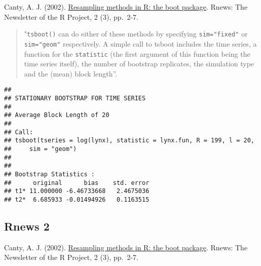 \documentclass[
]{book}
\newenvironment{Shaded}{\begin{snugshade}}{\end{snugshade}}
\newcommand{\CommentTok}[1]{\textcolor[rgb]{0.56,0.35,0.01}{\textit{#1}}}
\newcommand{\ControlFlowTok}[1]{\textcolor[rgb]{0.13,0.29,0.53}{\textbf{#1}}}
\newcommand{\DataTypeTok}[1]{\textcolor[rgb]{0.13,0.29,0.53}{#1}}
\newcommand{\DecValTok}[1]{\textcolor[rgb]{0.00,0.00,0.81}{#1}}
\newcommand{\KeywordTok}[1]{\textcolor[rgb]{0.13,0.29,0.53}{\textbf{#1}}}
\newcommand{\NormalTok}[1]{#1}
\newcommand{\OperatorTok}[1]{\textcolor[rgb]{0.81,0.36,0.00}{\textbf{#1}}}
\newcommand{\StringTok}[1]{\textcolor[rgb]{0.31,0.60,0.02}{#1}}
\theoremstyle{break}
\theoremstyle{definition}
\theoremstyle{definition}
\theoremstyle{definition}
\theoremstyle{remark}
\begin{document}
Canty, A. J. (2002). \href{http://cran.fhcrc.org/doc/Rnews/Rnews_2002-3.pdf}{Resampling methods in R: the boot package}. Rnews: The Newsletter of the R Project, 2 (3), pp.~2-7.

\begin{quote}
"\texttt{tsboot()} can do either of these methods
by specifying \texttt{sim="fixed"} or \texttt{sim="geom"} respectively.
A simple call to tsboot includes the time
series, a function for the \texttt{statistic} (the first argument
of this function being the time series itself), the number
of bootstrap replicates, the simulation type and
the (mean) block length''.
\end{quote}

\begin{Shaded}
\end{Shaded}

\begin{verbatim}
## 
## STATIONARY BOOTSTRAP FOR TIME SERIES
## 
## Average Block Length of 20 
## 
## Call:
## tsboot(tseries = log(lynx), statistic = lynx.fun, R = 199, l = 20, 
##     sim = "geom")
## 
## 
## Bootstrap Statistics :
##      original      bias    std. error
## t1* 11.000000 -6.46733668   2.4675036
## t2*  6.685933 -0.01494926   0.1163515
\end{verbatim}

\hypertarget{rnews-2}{%
\subsection{Rnews 2}\label{rnews-2}}

Canty, A. J. (2002). \href{http://cran.fhcrc.org/doc/Rnews/Rnews_2002-3.pdf}{Resampling methods in R: the boot package}. Rnews: The Newsletter of the R Project, 2 (3), pp.~2-7.
\end{document}
